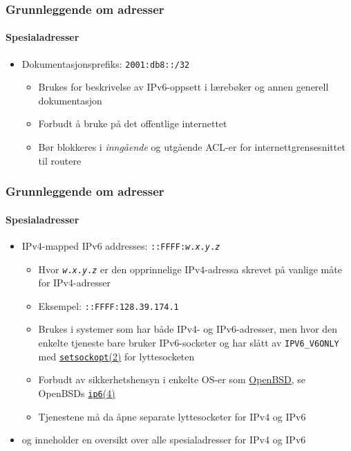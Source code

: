 \begin{frame}
  \frametitle{Grunnleggende om adresser}
  \framesubtitle{Spesialadresser}
  \begin{itemize}
  \item Dokumentasjonsprefiks: \texttt{2001:db8::/32}
    \begin{itemize}
    \item Brukes for beskrivelse av IPv6-oppsett i lærebøker og annen
      generell dokumentasjon 
    \item Forbudt å bruke på det offentlige internettet
    \item Bør blokkeres i \textit{inngående\/} og utgående ACL-er for
      internettgrensesnittet til routere
    \end{itemize}
  \end{itemize}
\end{frame}

\begin{frame}
  \frametitle{Grunnleggende om adresser}
  \framesubtitle{Spesialadresser}
  \begin{itemize}
  \item IPv4-mapped IPv6 addresses:
    \texttt{::FFFF:\textit{w}.\textit{x}.\textit{y}.\textit{z}}
    \begin{itemize}
    \item Hvor \texttt{\textit{w}.\textit{x}.\textit{y}.\textit{z}} er
      den opprinnelige IPv4-adressa skrevet på vanlige måte for IPv4-adresser
    \item Eksempel: \texttt{::FFFF:128.39.174.1}
    \item Brukes i systemer som har både IPv4- og IPv6-adresser, men
      hvor den enkelte tjeneste bare bruker IPv6-socketer og har slått
      av \texttt{IPV6\_V6ONLY} med
      \href{http://www.freebsd.org/cgi/man.cgi?query=setsockopt&apropos=0&sektion=2&manpath=FreeBSD+11.1-RELEASE&arch=default&format=html}{\texttt{setsockopt}(2)}
      for lyttesocketen
    \item Forbudt av sikkerhetshensyn i enkelte OS-er som
      \href{http://www.openbsd.org/}{OpenBSD}, se OpenBSDs
      \href{http://www.openbsd.org/cgi-bin/man.cgi?query=ip6&sektion=4}{\texttt{ip6}(4)}
    \item Tjenestene må da åpne separate lyttesocketer for IPv4 og
      IPv6
    \end{itemize}
  \item {} og  inneholder en oversikt over alle
    spesialadresser for IPv4 og IPv6
  \end{itemize}
\end{frame}

